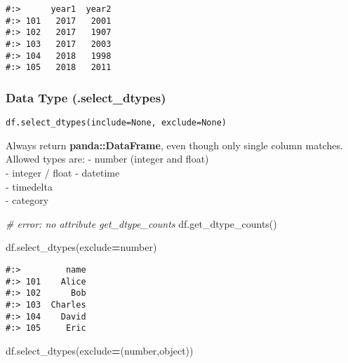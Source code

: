 \documentclass[
]{book}
\newenvironment{Shaded}{\begin{snugshade}}{\end{snugshade}}
\newcommand{\CommentTok}[1]{\textcolor[rgb]{0.37,0.37,0.37}{\textit{#1}}}
\newcommand{\NormalTok}[1]{#1}
\newcommand{\OperatorTok}[1]{\textcolor[rgb]{0.43,0.43,0.43}{\textbf{#1}}}
\newcommand{\StringTok}[1]{\textcolor[rgb]{0.5,0.5,0.5}{#1}}
\begin{document}
\begin{verbatim}
#:>      year1  year2
#:> 101   2017   2001
#:> 102   2017   1907
#:> 103   2017   2003
#:> 104   2018   1998
#:> 105   2018   2011
\end{verbatim}

\hypertarget{data-type-.select_dtypes}{%
\subsubsection{Data Type (.select\_dtypes)}\label{data-type-.select_dtypes}}

\begin{verbatim}
df.select_dtypes(include=None, exclude=None)
\end{verbatim}

Always return \textbf{panda::DataFrame}, even though only single column matches.\\
Allowed types are: - number (integer and float)\\
- integer / float - datetime\\
- timedelta\\
- category

\begin{Shaded}
\begin{Highlighting}[]
\CommentTok{\# error: no attribute get\_dtype\_counts}
\NormalTok{df.get\_dtype\_counts()}
\end{Highlighting}
\end{Shaded}

\begin{Shaded}
\begin{Highlighting}[]
\NormalTok{df.select\_dtypes(exclude}\OperatorTok{=}\StringTok{\textquotesingle{}number\textquotesingle{}}\NormalTok{)}
\end{Highlighting}
\end{Shaded}

\begin{verbatim}
#:>         name
#:> 101    Alice
#:> 102      Bob
#:> 103  Charles
#:> 104    David
#:> 105     Eric
\end{verbatim}

\begin{Shaded}
\begin{Highlighting}[]
\NormalTok{df.select\_dtypes(exclude}\OperatorTok{=}\NormalTok{(}\StringTok{\textquotesingle{}number\textquotesingle{}}\NormalTok{,}\StringTok{\textquotesingle{}object\textquotesingle{}}\NormalTok{))}
\end{Highlighting}
\end{Shaded}
\end{document}
